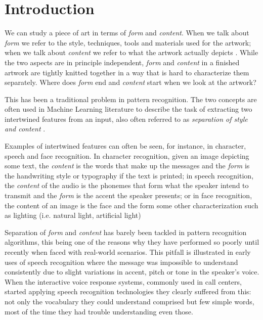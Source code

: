 
\chapter{Introduction}
\label{sec:intro}


We can study a piece of art in terms of \emph{form} and \emph{content}.
When we talk about \emph{form} we refer to the style, techniques, tools and materials used for the artwork; when we talk about \emph{content} we refer to what the artwork actually depicts \cite{Esaak}.
While the two aspects are in principle independent, \emph{form} and \emph{content} in a finished artwork are tightly knitted together in a way that is hard to characterize them separately. Where does \emph{form} end and \emph{content} start when we look at the artwork?

This has been a traditional problem in pattern recognition.
The two concepts are often used in Machine Learning literature to describe the task of extracting two intertwined features from an input, also often referred to as \emph{separation of style and content} \cite{Tenenbaum1997,Tenenbaum2000}.

Examples of intertwined features can often be seen, for instance, in character, speech and face recognition.
In character recognition, given an image depicting some text, the \emph{content} is the words that make up the messages and the \emph{form} is the handwriting style or typography if the text is printed; in speech recognition, the \emph{content} of the audio is the phonemes that form what the speaker intend to transmit and the \emph{form} is the accent the speaker presents; or in face recognition, the content of an image is the face and the form some other characterization such as lighting (i.e. natural light, artificial light)

Separation of \emph{form} and \emph{content} has barely been tackled in pattern recognition algorithms, this being one of the reasons why they have performed so poorly until recently when faced with real-world scenarios.
This pitfall is illustrated in early uses of speech recognition where the message was impossible to understand consistently due to slight variations in accent, pitch or tone in the speaker's voice.
When the interactive voice response systems, commonly used in call centers, started applying speech recognition technologies they clearly suffered from this: not only the vocabulary they could understand comprised but few simple words, most of the time they had trouble understanding even those.

